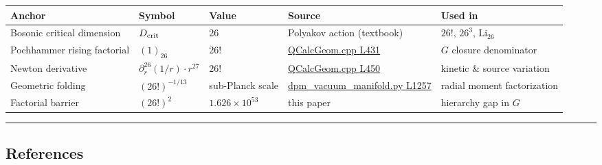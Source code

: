 \documentclass[
]{article}
\newcounter{none} %
\begin{document}
{\def\LTcaptype{none} %
\begin{longtable}[]{@{}
  >{\raggedright\arraybackslash}p{}
  >{\raggedright\arraybackslash}p{}
  >{\raggedleft\arraybackslash}p{}
  >{\raggedright\arraybackslash}p{}
  >{\raggedright\arraybackslash}p{}@{}}
\toprule\noalign{}
\begin{minipage}[b]{\linewidth}\raggedright
Anchor
\end{minipage} & \begin{minipage}[b]{\linewidth}\raggedright
Symbol
\end{minipage} & \begin{minipage}[b]{\linewidth}\raggedleft
Value
\end{minipage} & \begin{minipage}[b]{\linewidth}\raggedright
Source
\end{minipage} & \begin{minipage}[b]{\linewidth}\raggedright
Used in
\end{minipage} \\
\midrule\noalign{}
\endhead
\bottomrule\noalign{}
\endlastfoot
Bosonic critical dimension & \(D_{\rm crit}\) & \(26\) & Polyakov action
(textbook) & \(26!\), \(26^3\), \(\mathrm{Li}_{26}\) \\
Pochhammer rising factorial & \((1)_{26}\) & \(26!\) &
\href{QCalcGeom.cpp\#L431}{QCalcGeom.cpp L431} & \(G\) closure
denominator \\
Newton derivative & \(\partial_r^{26}(1/r)\cdot r^{27}\) & \(26!\) &
\href{QCalcGeom.cpp\#L450}{QCalcGeom.cpp L450} & kinetic \& source
variation \\
Geometric folding & \((26!)^{-1/13}\) & sub-Planck scale &
\href{dpm_vacuum_manifold.py\#L1257}{dpm\_vacuum\_manifold.py L1257} &
radial moment factorization \\
Factorial barrier & \((26!)^2\) & \(1.626\times10^{53}\) & this paper &
hierarchy gap in \(G\) \\
\end{longtable}
}

\begin{center}\rule{0.5\linewidth}{0.5pt}\end{center}

\subsection{References}\label{references}
\end{document}
